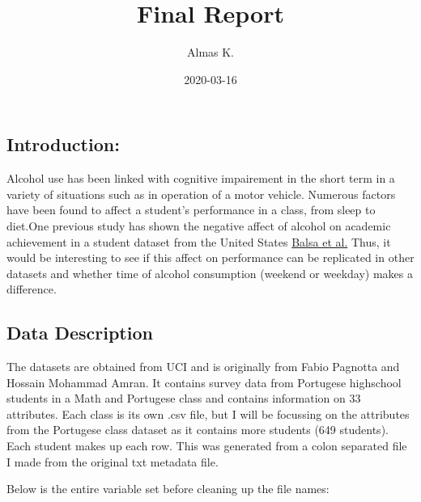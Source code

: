 \documentclass[]{article}
\title{Final Report}
\author{Almas K.}
\date{2020-03-16}
\begin{document}
\maketitle

\hypertarget{introduction}{%
\subsection{Introduction:}\label{introduction}}

Alcohol use has been linked with cognitive impairement in the short term
in a variety of situations such as in operation of a motor vehicle.
Numerous factors have been found to affect a student's performance in a
class, from sleep to diet.One previous study has shown the negative
affect of alcohol on academic achievement in a student dataset from the
United States
\href{https://www.ncbi.nlm.nih.gov/pmc/articles/PMC3026599/}{Balsa et
al.} Thus, it would be interesting to see if this affect on performance
can be replicated in other datasets and whether time of alcohol
consumption (weekend or weekday) makes a difference.

\hypertarget{data-description}{%
\subsection{Data Description}\label{data-description}}

The datasets are obtained from UCI and is originally from Fabio Pagnotta
and Hossain Mohammad Amran. It contains survey data from Portugese
highschool students in a Math and Portugese class and contains
information on 33 attributes. Each class is its own .csv file, but I
will be focussing on the attributes from the Portugese class dataset as
it contains more students (649 students). Each student makes up each
row. This was generated from a colon separated file I made from the
original txt metadata file.

Below is the entire variable set before cleaning up the file names:
\end{document}

